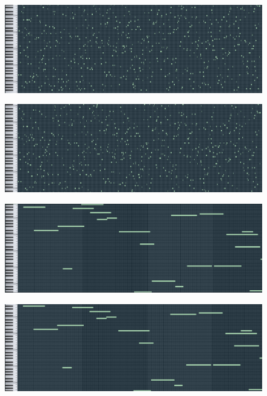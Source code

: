 \documentclass[conference]{IEEEtran}
\begin{document}
\begin{figure}
\centering
\begin{minipage}{.5\textwidth}
  \centering
  \includegraphics[width=.9\linewidth]{fitness2-first-full.png}
  \label{fig:test1}
\end{minipage}%
\begin{minipage}{.5\textwidth}
  \centering
  \includegraphics[width=.9\linewidth]{fitness2-final-full.png}
  \label{fig:test2}
\end{minipage}

\centering
\begin{minipage}{.5\textwidth}
  \centering
  \includegraphics[width=.9\linewidth]{fitness3-first-30.png}
  \label{fig:test1}
\end{minipage}%
\begin{minipage}{.5\textwidth}
  \centering
  \includegraphics[width=.9\linewidth]{fitness3-final-30.png}
  \label{fig:test2}
\end{minipage}


\end{figure}
\end{document}
